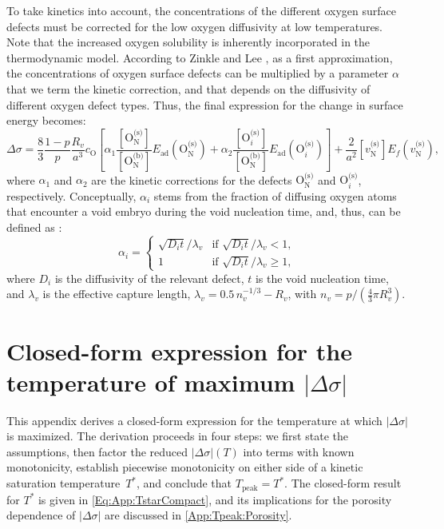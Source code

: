 \documentclass[preprint,12pt,sort&compress]{elsarticle}
\newcommand{\?}{\stackrel{?}{=}}
\begin{document}
To take kinetics into account, the concentrations of the different oxygen surface defects must be corrected for the low oxygen diffusivity at low temperatures. Note that the increased oxygen solubility is inherently incorporated in the thermodynamic model. According to Zinkle and Lee \cite{Zinkle1990}, as a first approximation, the concentrations of oxygen surface defects can be multiplied by a parameter $\alpha$ that we term the kinetic correction, and that depends on the diffusivity of different oxygen defect types. Thus, the final expression for the change in surface energy becomes:
\begin{equation}
\Delta \sigma = \frac{8}{3} \frac{1-p}{p} \frac{R_v}{a^3} c_\text{O} \left[ \alpha_1 \frac{ [ \text{O}_\text{N}^{\text{(s)}} ] }{ [ \text{O}_\text{N}^{\text{(b)}} ] }  E_\text{ad}( \text{O}_\text{N}^{\text{(s)}} ) + \alpha_2 \frac{ [ \text{O}_i^{\text{(s)}} ] }{ [ \text{O}_\text{N}^{\text{(b)}} ] }  E_\text{ad}( \text{O}_i^{\text{(s)}} ) \right] + \frac{2}{a^2} [ v_\text{N}^{\text{(s)}} ] E_f ( v_\text{N}^{\text{(s)}} ),
\end{equation}
where $\alpha_1$ and $\alpha_2$ are the kinetic corrections for the defects $\text{O}_\text{N}^\text{(s)}$ and $\text{O}_i^{\text{(s)}}$, respectively. Conceptually, $\alpha_i$ stems from the fraction of diffusing oxygen atoms that encounter a void embryo during the void nucleation time, and, thus, can be defined as \cite{Zinkle1990}:
\begin{equation}
\alpha_i =
\begin{cases}
    \sqrt{D_i t}/\lambda_v & \text{if } \sqrt{D_i t}/\lambda_v < 1, \\
    1 & \text{if } \sqrt{D_i t}/\lambda_v \geq 1,
\end{cases}    
\end{equation}
where $D_i$ is the diffusivity of the relevant defect, $t$ is the void nucleation time, and $\lambda_v$ is the effective capture length, $\lambda_v=0.5\,n_v^{-1/3}-R_v$, with $n_v = p / ( \frac{4}{3} \pi R_v^3 ) $.

\FloatBarrier

\section{Closed-form expression for the temperature of maximum $|\Delta \sigma|$}
\label{App:Tpeak}
 
This appendix derives a closed-form expression for the temperature at which $|\Delta \sigma|$ is maximized. The derivation proceeds in four steps: we first state the assumptions, then factor the reduced $|\Delta \sigma|(T)$ into terms with known monotonicity, establish piecewise monotonicity on either side of a kinetic saturation temperature~$T^*$, and conclude that $T_\text{peak} = T^*$. The closed-form result for $T^*$ is given in \cref{Eq:App:TstarCompact}, and its implications for the porosity dependence of $|\Delta \sigma|$ are discussed in \ref{App:Tpeak:Porosity}.
 
\end{document}
